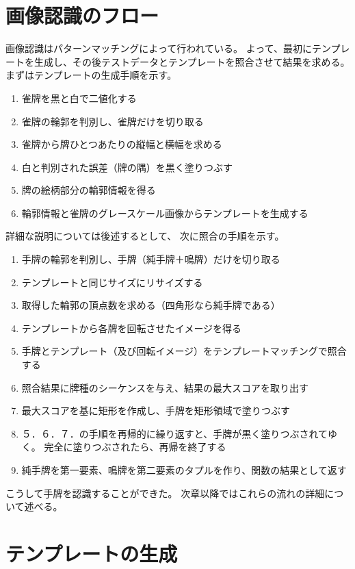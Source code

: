 \documentclass{jsarticle}
\begin{document}
\begin{multicols}{2}
\section{画像認識のフロー}

画像認識はパターンマッチングによって行われている。
よって、最初にテンプレートを生成し、その後テストデータとテンプレートを照合させて結果を求める。
まずはテンプレートの生成手順を示す。
\begin{enumerate}
\item 雀牌を黒と白で二値化する
\item 雀牌の輪郭を判別し、雀牌だけを切り取る
\item 雀牌から牌ひとつあたりの縦幅と横幅を求める
\item 白と判別された誤差（牌の隅）を黒く塗りつぶす
\item 牌の絵柄部分の輪郭情報を得る
\item 輪郭情報と雀牌のグレースケール画像からテンプレートを生成する
\end{enumerate}

詳細な説明については後述するとして、
次に照合の手順を示す。
\begin{enumerate}
\item 手牌の輪郭を判別し、手牌（純手牌＋鳴牌）だけを切り取る
\item テンプレートと同じサイズにリサイズする
\item 取得した輪郭の頂点数を求める（四角形なら純手牌である）
\item テンプレートから各牌を回転させたイメージを得る
\item 手牌とテンプレート（及び回転イメージ）をテンプレートマッチングで照合する
\item 照合結果に牌種のシーケンスを与え、結果の最大スコアを取り出す
\item 最大スコアを基に矩形を作成し、手牌を矩形領域で塗りつぶす
\item ５．６．７．の手順を再帰的に繰り返すと、手牌が黒く塗りつぶされてゆく。
		  完全に塗りつぶされたら、再帰を終了する
\item 純手牌を第一要素、鳴牌を第二要素のタプルを作り、関数の結果として返す
\end{enumerate}

こうして手牌を認識することができた。
次章以降ではこれらの流れの詳細について述べる。

\section{テンプレートの生成}


\end{multicols}
\end{document}
